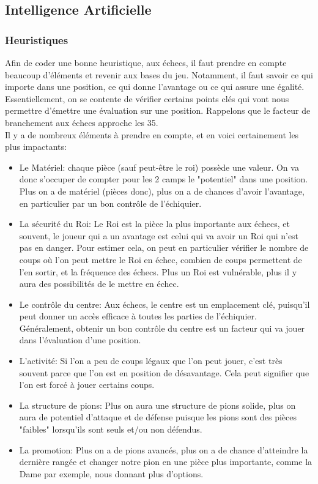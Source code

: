 \documentclass{article}
\begin{document}
\subsection{Intelligence Artificielle} \label{AI}
\subsubsection{Heuristiques}
Afin de coder une bonne heuristique, aux échecs, il faut prendre en compte beaucoup d'éléments et revenir aux bases du jeu.
Notamment, il faut savoir ce qui importe dans une position, ce qui donne l'avantage ou ce qui assure une égalité. Essentiellement,
on se contente de vérifier certains points clés qui vont nous permettre d'émettre une évaluation sur une position.
Rappelons que le facteur de branchement aux échecs approche les 35.\\
Il y a de nombreux éléments à prendre en compte, et en voici certainement les plus impactants:
\begin{itemize}
    \item Le Matériel: chaque pièce (sauf peut-être le roi) possède une valeur. On va donc s'occuper de compter pour les 2 camps le "potentiel"
    dans une position. Plus on a de matériel (pièces donc), plus on a de chances d'avoir l'avantage, en particulier par un bon contrôle de l'échiquier.
    \item La sécurité du Roi: Le Roi est la pièce la plus importante aux échecs, et souvent, le joueur qui a un avantage est celui qui va
    avoir un Roi qui n'est pas en danger. Pour estimer cela, on peut en particulier vérifier le nombre de coups où l'on peut mettre le Roi en échec,
    combien de coups permettent de l'en sortir, et la fréquence des échecs. Plus un Roi est vulnérable, plus il y aura des possibilités
    de le mettre en échec.
    \item Le contrôle du centre: Aux échecs, le centre est un emplacement clé, puisqu'il peut donner un accès efficace à toutes les parties de
    l'échiquier. Généralement, obtenir un bon contrôle du centre est un facteur qui va jouer dans l'évaluation d'une position.
    \item L'activité: Si l'on a peu de coups légaux que l'on peut jouer, c'est très souvent parce que l'on est en position de désavantage. Cela peut
    signifier que l'on est forcé à jouer certains coups.
    \item La structure de pions: Plus on aura une structure de pions solide, plus on aura de potentiel d'attaque et de défense puisque les pions sont
    des pièces "faibles" lorsqu'ils sont seuls et/ou non défendus.
    \item La promotion: Plus on a de pions avancés, plus on a de chance d'atteindre la dernière rangée et changer notre pion en une pièce plus importante,
    comme la Dame par exemple, nous donnant plus d'options.\\
\end{itemize}
\end{document}
